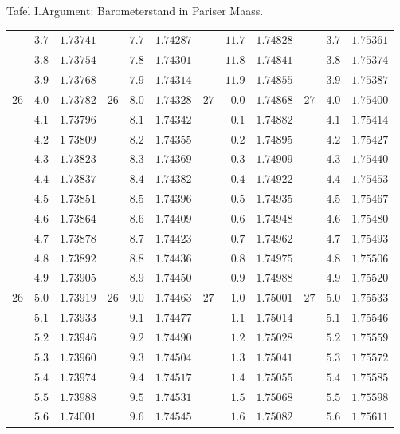 \begin{GaussVIRefractionPlate}{Tafel I.\quad Argument: Barometerstand in Pariser Maass.}
{\begin{tabular}{rr|r||rr|r||rr|r||rr|r}
 & $3.7$ & $1.73741$ &  & $7.7$ & $1.74287$ &  & $11.7$ & $1.74828$ &  & $3.7$ & $1.75361$\\
 & $3.8$ & $1.73754$ &  & $7.8$ & $1.74301$ &  & $11.8$ & $1.74841$ &  & $3.8$ & $1.75374$\\
 & $3.9$ & $1.73768$ &  & $7.9$ & $1.74314$ &  & $11.9$ & $1.74855$ &  & $3.9$ & $1.75387$\\[4pt]
$26$ & $4.0$ & $1.73782$ & $26$ & $8.0$ & $1.74328$ & $27$ & $0.0$ & $1.74868$ & $27$ & $4.0$ & $1.75400$\\
 & $4.1$ & $1.73796$ &  & $8.1$ & $1.74342$ &  & $0.1$ & $1.74882$ &  & $4.1$ & $1.75414$\\
 & $4.2$ & $1\;73809$ &  & $8.2$ & $1.74355$ &  & $0.2$ & $1.74895$ &  & $4.2$ & $1.75427$\\
 & $4.3$ & $1.73823$ &  & $8.3$ & $1.74369$ &  & $0.3$ & $1.74909$ &  & $4.3$ & $1.75440$\\
 & $4.4$ & $1.73837$ &  & $8.4$ & $1.74382$ &  & $0.4$ & $1.74922$ &  & $4.4$ & $1.75453$\\
 & $4.5$ & $1.73851$ &  & $8.5$ & $1.74396$ &  & $0.5$ & $1.74935$ &  & $4.5$ & $1.75467$\\
 & $4.6$ & $1.73864$ &  & $8.6$ & $1.74409$ &  & $0.6$ & $1.74948$ &  & $4.6$ & $1.75480$\\
 & $4.7$ & $1.73878$ &  & $8.7$ & $1.74423$ &  & $0.7$ & $1.74962$ &  & $4.7$ & $1.75493$\\
 & $4.8$ & $1.73892$ &  & $8.8$ & $1.74436$ &  & $0.8$ & $1.74975$ &  & $4.8$ & $1.75506$\\
 & $4.9$ & $1.73905$ &  & $8.9$ & $1.74450$ &  & $0.9$ & $1.74988$ &  & $4.9$ & $1.75520$\\[4pt]
$26$ & $5.0$ & $1.73919$ & $26$ & $9.0$ & $1.74463$ & $27$ & $1.0$ & $1.75001$ & $27$ & $5.0$ & $1.75533$\\
 & $5.1$ & $1.73933$ &  & $9.1$ & $1.74477$ &  & $1.1$ & $1.75014$ &  & $5.1$ & $1.75546$\\
 & $5.2$ & $1.73946$ &  & $9.2$ & $1.74490$ &  & $1.2$ & $1.75028$ &  & $5.2$ & $1.75559$\\
 & $5.3$ & $1.73960$ &  & $9.3$ & $1.74504$ &  & $1.3$ & $1.75041$ &  & $5.3$ & $1.75572$\\
 & $5.4$ & $1.73974$ &  & $9.4$ & $1.74517$ &  & $1.4$ & $1.75055$ &  & $5.4$ & $1.75585$\\
 & $5.5$ & $1.73988$ &  & $9.5$ & $1.74531$ &  & $1.5$ & $1.75068$ &  & $5.5$ & $1.75598$\\
 & $5.6$ & $1.74001$ &  & $9.6$ & $1.74545$ &  & $1.6$ & $1.75082$ &  & $5.6$ & $1.75611$\\

\end{tabular}}
\end{GaussVIRefractionPlate}
